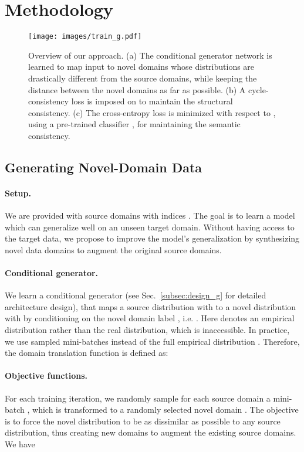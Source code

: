\documentclass[runningheads]{llncs}
\begin{document}
\section{Methodology} \label{sec:method}

\begin{figure}[t]
    \centering
    \texttt{[image: images/train\_g.pdf]}
    \caption{Overview of our approach. (a) The conditional generator network  is learned to map input  to novel domains whose distributions are drastically different from the source domains, while keeping the distance between the novel domains as far as possible. (b) A cycle-consistency loss is imposed on  to maintain the structural consistency. (c) The cross-entropy loss is minimized with respect to , using a pre-trained classifier , for maintaining the semantic consistency.}
    \label{fig:train_g}
\end{figure}

\subsection{Generating Novel-Domain Data} \label{subsec:generate_novel_domain} 

\paragraph{Setup.}
We are provided with  source domains with indices . The goal is to learn a model which can generalize well on an unseen target domain. Without having access to the target data, we propose to improve the model's generalization by synthesizing novel data domains  to augment the original source domains.

\paragraph{Conditional generator.}
We learn a conditional generator  (see Sec.~\ref{subsec:design_g} for detailed architecture design), that maps a source distribution  with  to a novel distribution  with  by conditioning on the novel domain label , i.e. . Here  denotes an empirical distribution rather than the real distribution, which is inaccessible. In practice, we use sampled mini-batches  instead of the full empirical distribution . Therefore, the domain translation function is defined as:


\paragraph{Objective functions.}
For each training iteration, we randomly sample for each source domain  a mini-batch , which is transformed to a randomly selected novel domain . The objective is to force the novel distribution to be as dissimilar as possible to any source distribution, thus creating new domains to augment the existing source domains. We have
\end{document}
